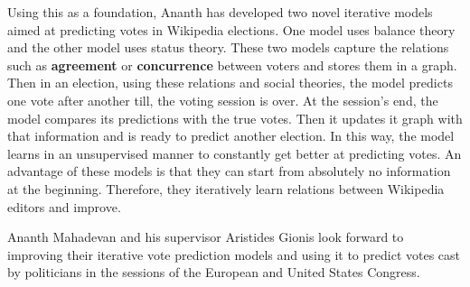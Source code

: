 \documentclass[12pt,a4paper]{article}
\begin{document}
\medskip
\noindent
Using this as a foundation, Ananth has developed two novel iterative models aimed at predicting votes in Wikipedia elections.
One model uses balance theory and the other model uses status theory.
These two models capture the relations such as \textbf{agreement} or \textbf{concurrence} between voters and stores them in a graph.
Then in an election, using these relations and social theories, the model predicts one vote after another till, the voting session is over.
At the session's end, the model compares its predictions with the true votes.
Then it updates it graph with that information and is ready to predict another election.
In this way, the model learns in an unsupervised manner to constantly get better at predicting votes.
An advantage of these models is that they can start from absolutely no information at the beginning.
Therefore, they iteratively learn relations between Wikipedia editors and improve. 

\medskip
\noindent
Ananth Mahadevan and his supervisor Aristides Gionis look forward to improving their iterative vote prediction models and using it to predict votes cast by politicians in the sessions of the European and United States Congress.
\end{document}
